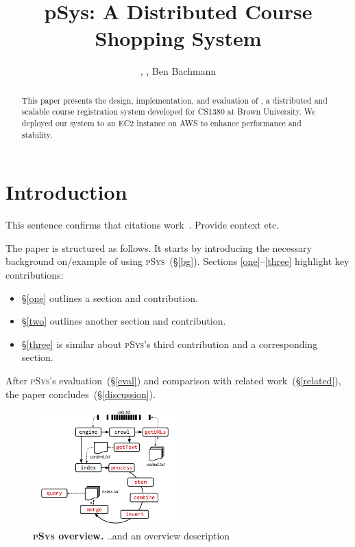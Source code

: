 \documentclass[sigplan, screen, 10pt]{acmart}
\title{pSys: A Distributed Course Shopping System}
\author{, , Ben Bachmann}
\affiliation{Brown University}
\newcommand{\sx}[1]{(\S\ref{#1})}
\newcommand{\sys}{{\scshape pSys}\xspace}
\begin{document}
\begin{abstract}
This paper presents the design, implementation, and evaluation of \CourseCluster, a distributed and scalable course registration system developed for CS1380 at Brown University. We deployed our system to an EC2 instance on AWS to enhance performance and stability.
\end{abstract}

\maketitle


\section{Introduction}
\label{intro}

This sentence confirms that citations work~\cite{kpn74, dryad07}. Provide
context etc.

The paper is structured as follows.
It starts by introducing the necessary background on/example of using \sys~\sx{bg}.
Sections \ref{one}--\ref{three} highlight key contributions:
\begin{itemize}
	\item
	\S\ref{one}
		outlines a section and contribution.

	\item
	\S\ref{two} outlines another section and contribution.

	\item
	\S\ref{three} is similar about \sys's third contribution and a corresponding section.

\end{itemize}

\noindent
After \sys's evaluation~\sx{eval} and  comparison with related work~\sx{related}, the paper concludes~\sx{discussion}.  

\begin{figure}[t]
\centering
\includegraphics[width=0.49\textwidth]{./figs/overview.pdf}
\caption{
  \textbf{\sys overview.}
  ..and an overview description
}
\vspace{-18pt}
\label{fig:overview}
\end{figure}
\end{document}
